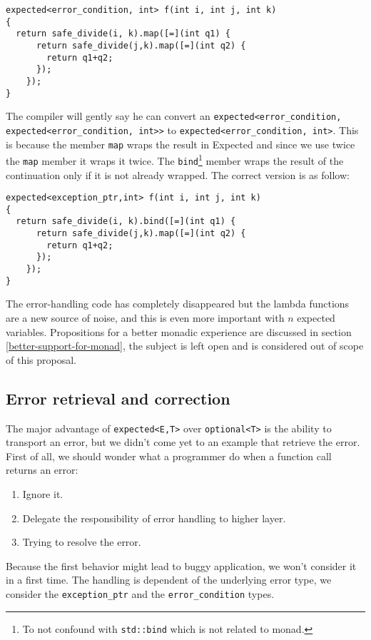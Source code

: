 \documentclass[a4paper,10pt]{article}
\newcommand{\cpp}[1]{\lstinline{#1}}
\begin{document}
\begin{lstlisting}
expected<error_condition, int> f(int i, int j, int k)
{
  return safe_divide(i, k).map([=](int q1) {
      return safe_divide(j,k).map([=](int q2) {
        return q1+q2;
      });
    });
}
\end{lstlisting}

The compiler will gently say he can convert an \cpp{expected<error_condition, expected<error_condition, int>>} to \cpp{expected<error_condition, int>}. This is because the member \cpp{map} wraps the result in Expected and since we use twice the \cpp{map} member it wraps it twice. The \cpp{bind}\footnote{To not confound with \cpp{std::bind} which is not related to monad.} member wraps the result of the continuation only if it is not already wrapped. The correct version is as follow:

\begin{lstlisting}
expected<exception_ptr,int> f(int i, int j, int k)
{
  return safe_divide(i, k).bind([=](int q1) {
      return safe_divide(j,k).map([=](int q2) {
        return q1+q2;
      });
    });
}
\end{lstlisting}

The error-handling code has completely disappeared but the lambda functions are a new source of noise, and this is even more important with $n$ expected variables. Propositions for a better monadic experience are discussed in section \ref{better-support-for-monad}, the subject is left open and is considered out of scope of this proposal.

\subsection{Error retrieval and correction}

The major advantage of \cpp{expected<E,T>} over \cpp{optional<T>} is the ability to transport an error, but we didn't come yet to an example that retrieve the error. First of all, we should wonder what a programmer do when a function call returns an error:

\begin{enumerate}
 \item Ignore it.
 \item Delegate the responsibility of error handling to higher layer.
 \item Trying to resolve the error.
\end{enumerate}

Because the first behavior might lead to buggy application, we won't consider it in a first time. The handling is dependent of the underlying error type, we consider the \cpp{exception_ptr} and the \cpp{error_condition} types.
\end{document}
